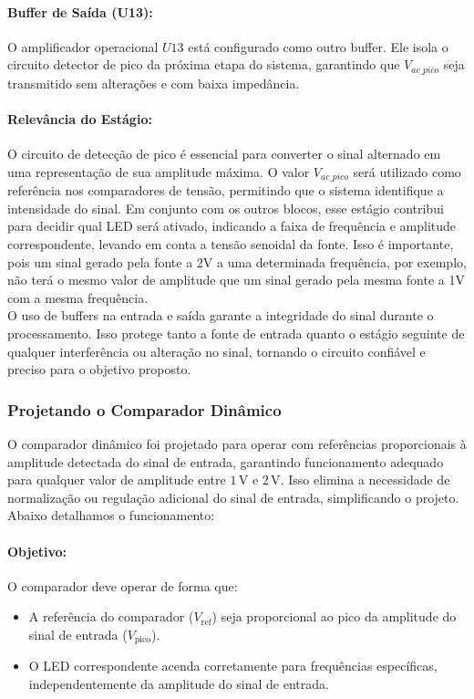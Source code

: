 \documentclass[a4paper, 12pt]{article}
\begin{document}
\paragraph{Buffer de Saída (U13):}
O amplificador operacional \( U13 \) está configurado como outro buffer. Ele isola o circuito detector de pico da próxima etapa do sistema, garantindo que \( V_{ac\_pico} \) seja transmitido sem alterações e com baixa impedância.\\

\paragraph{Relevância do Estágio:}
O circuito de detecção de pico é essencial para converter o sinal alternado em uma representação de sua amplitude máxima. O valor \( V_{ac\_pico} \) será utilizado como referência nos comparadores de tensão, permitindo que o sistema identifique a intensidade do sinal. Em conjunto com os outros blocos, esse estágio contribui para decidir qual LED será ativado, indicando a faixa de frequência e amplitude correspondente, levando em conta a tensão senoidal da fonte. Isso é importante, pois um sinal gerado pela fonte a 2V a uma determinada frequência, por exemplo, não terá o mesmo valor de amplitude que um sinal gerado pela mesma fonte a 1V com a mesma frequência.  \\
O uso de buffers na entrada e saída garante a integridade do sinal durante o processamento. Isso protege tanto a fonte de entrada quanto o estágio seguinte de qualquer interferência ou alteração no sinal, tornando o circuito confiável e preciso para o objetivo proposto.

\subsubsection{Projetando o Comparador Dinâmico}

O comparador dinâmico foi projetado para operar com referências proporcionais à amplitude detectada do sinal de entrada, garantindo funcionamento adequado para qualquer valor de amplitude entre $1\, \mathrm{V}$ e $2\, \mathrm{V}$. Isso elimina a necessidade de normalização ou regulação adicional do sinal de entrada, simplificando o projeto. Abaixo detalhamos o funcionamento:

\paragraph{Objetivo:}
O comparador deve operar de forma que:
\begin{itemize}
    \item A referência do comparador ($V_{\mathrm{ref}}$) seja proporcional ao pico da amplitude do sinal de entrada ($V_{\mathrm{pico}}$).
    \item O LED correspondente acenda corretamente para frequências específicas, independentemente da amplitude do sinal de entrada.
\end{itemize}
\end{document}
